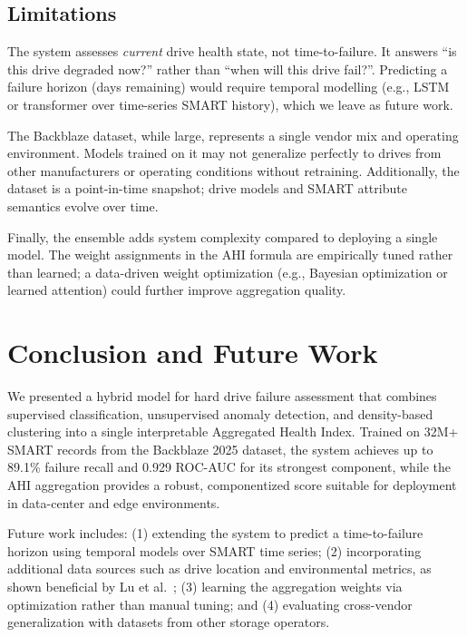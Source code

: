 \documentclass[sigconf,natbib=false, language=english]{acmart}
\begin{document}
\subsection{Limitations}

The system assesses \emph{current} drive health state, not time-to-failure. It answers ``is this drive degraded now?'' rather than ``when will this drive fail?''. Predicting a failure horizon (days remaining) would require temporal modelling (e.g., LSTM or transformer over time-series SMART history), which we leave as future work.

The Backblaze dataset, while large, represents a single vendor mix and operating environment. Models trained on it may not generalize perfectly to drives from other manufacturers or operating conditions without retraining. Additionally, the dataset is a point-in-time snapshot; drive models and SMART attribute semantics evolve over time.

Finally, the ensemble adds system complexity compared to deploying a single model. The weight assignments in the AHI formula are empirically tuned rather than learned; a data-driven weight optimization (e.g., Bayesian optimization or learned attention) could further improve aggregation quality.

\section{Conclusion and Future Work}
\label{sec:conclusion}

We presented a hybrid model for hard drive failure assessment that combines supervised classification, unsupervised anomaly detection, and density-based clustering into a single interpretable Aggregated Health Index. Trained on 32M+ SMART records from the Backblaze 2025 dataset, the system achieves up to 89.1\% failure recall and 0.929 ROC-AUC for its strongest component, while the AHI aggregation provides a robust, componentized score suitable for deployment in data-center and edge environments.

Future work includes: (1) extending the system to predict a time-to-failure horizon using temporal models over SMART time series; (2) incorporating additional data sources such as drive location and environmental metrics, as shown beneficial by Lu et al.~\cite{lu2020smarter}; (3) learning the aggregation weights via optimization rather than manual tuning; and (4) evaluating cross-vendor generalization with datasets from other storage operators.


\printbibliography
\end{document}

